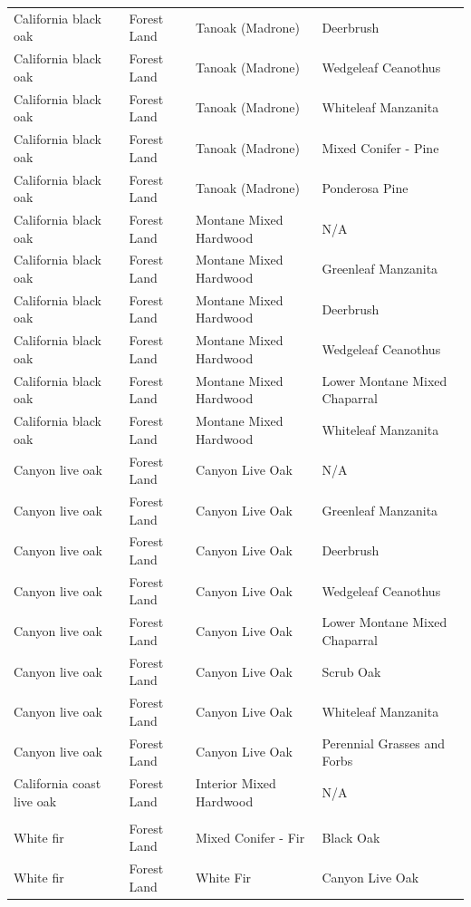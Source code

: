 \documentclass{article}
\begin{document}
\begin{tabular}{llll}
California black oak	&	Forest Land	&	Tanoak (Madrone)	&	Deerbrush	\\
California black oak	&	Forest Land	&	Tanoak (Madrone)	&	Wedgeleaf Ceanothus	\\
California black oak	&	Forest Land	&	Tanoak (Madrone)	&	Whiteleaf Manzanita	\\
California black oak	&	Forest Land	&	Tanoak (Madrone)	&	Mixed Conifer - Pine	\\
California black oak	&	Forest Land	&	Tanoak (Madrone)	&	Ponderosa Pine	\\
California black oak	&	Forest Land	&	Montane Mixed Hardwood	&	N/A	\\
California black oak	&	Forest Land	&	Montane Mixed Hardwood	&	Greenleaf Manzanita	\\
California black oak	&	Forest Land	&	Montane Mixed Hardwood	&	Deerbrush	\\
California black oak	&	Forest Land	&	Montane Mixed Hardwood	&	Wedgeleaf Ceanothus	\\
California black oak	&	Forest Land	&	Montane Mixed Hardwood	&	Lower Montane Mixed Chaparral	\\
California black oak	&	Forest Land	&	Montane Mixed Hardwood	&	Whiteleaf Manzanita	\\
Canyon live oak	&	Forest Land	&	Canyon Live Oak	&	N/A	\\
Canyon live oak	&	Forest Land	&	Canyon Live Oak	&	Greenleaf Manzanita	\\
Canyon live oak	&	Forest Land	&	Canyon Live Oak	&	Deerbrush	\\
Canyon live oak	&	Forest Land	&	Canyon Live Oak	&	Wedgeleaf Ceanothus	\\
Canyon live oak	&	Forest Land	&	Canyon Live Oak	&	Lower Montane Mixed Chaparral	\\
Canyon live oak	&	Forest Land	&	Canyon Live Oak	&	Scrub Oak	\\
Canyon live oak	&	Forest Land	&	Canyon Live Oak	&	Whiteleaf Manzanita	\\
Canyon live oak	&	Forest Land	&	Canyon Live Oak	&	Perennial Grasses and Forbs	\\
California coast live oak	&	Forest Land	&	Interior Mixed Hardwood	&	N/A	\\
	&		&		&		\\
White fir	&	Forest Land	&	Mixed Conifer - Fir	&	Black Oak	\\
White fir	&	Forest Land	&	White Fir	&	Canyon Live Oak	\\
\end{tabular}\\
\normalsize
\end{document}

